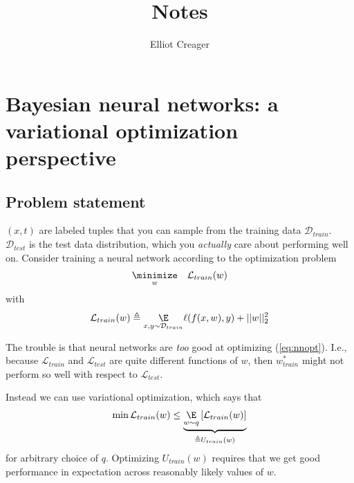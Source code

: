 \documentclass[11pt]{amsart}
\title{Notes}
\author{Elliot Creager}
\begin{document}
\maketitle
\section{Bayesian neural networks: a variational optimization perspective}
\subsection{Problem statement}
$(x, t)$ are labeled tuples that you can sample from the training data $\mathcal{D}_{train}$.
$\mathcal{D}_{test}$ is the test data distribution, which you \emph{actually} care about performing well on.
Consider training a neural network according to the optimization problem
\begin{align}\label{eq:nnopt}
\underset{w}{\minimize} \quad \mathcal{L}_{train}(w)
\end{align}
with 
\begin{align}
\mathcal{L}_{train}(w) \triangleq \underset{x, y \sim \mathcal{D}_{train}}{\E} \ell (f(x, w), y) + ||w||^2_2
\end{align}

The trouble is that neural networks are \emph{too} good at optimizing (\ref{eq:nnopt}).
I.e., because $\mathcal{L}_{train}$ and $\mathcal{L}_{test}$ are quite different functions of $w$, then $w^*_{train}$ might not perform so well with respect to $\mathcal{L}_{test}$.

Instead we can use variational optimization, which says that 
\begin{align}
\min \mathcal{L}_{train}(w) \leq 
\underbrace{
\underset{w \sim q}{\E} \left[ \mathcal{L}_{train}(w) \right]
}_{\triangleq U_{train}(w)}
\end{align}
for arbitrary choice of $q$. 
Optimizing $U_{train}(w)$ requires that we get good performance in expectation across reasonably likely values of $w$.
\end{document}
